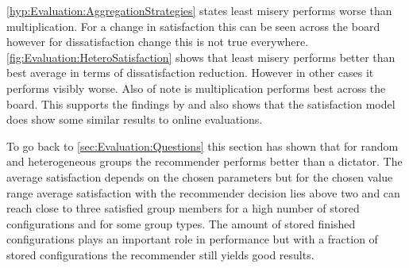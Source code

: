 \autoref{hyp:Evaluation:AggregationStrategies} states least misery performs worse than multiplication. For a change in satisfaction this can be seen across the board however for dissatisfaction change this is not true everywhere. \autoref{fig:Evaluation:HeteroSatisfaction} shows that least misery performs better than best average in terms of dissatisfaction reduction. However in other cases it performs visibly worse. Also of note is multiplication performs best across the board. This supports the findings by \citeauthor{Masthoff2015} \cite[p. 755f]{Masthoff2015} and also shows that the satisfaction model does show some similar results to online evaluations.


To go back to \autoref{sec:Evaluation:Questions} this section has shown that for random and heterogeneous groups the recommender performs better than a dictator. The average satisfaction depends on the chosen parameters but for the chosen value range average satisfaction with the recommender decision lies above two and can reach close to three satisfied group members for a high number of stored configurations and for some group types. The amount of stored finished configurations plays an important role in performance but with a fraction of stored configurations the recommender still yields good results.

